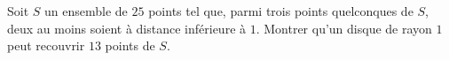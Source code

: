 Soit $S$ un ensemble de $25$ points tel que, parmi trois points quelconques de $S$, deux au moins soient à distance inférieure à $1$. Montrer qu'un disque de rayon $1$ peut recouvrir $13$ points de $S$.
